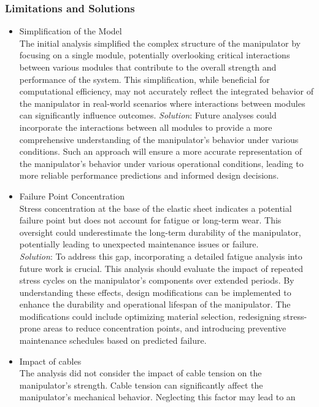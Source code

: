 \subsubsection{Limitations and Solutions}
\begin{itemize}
    \item Simplification of the Model \\
    The initial analysis simplified the complex structure of the manipulator by focusing on a single module, 
    potentially overlooking critical interactions between various modules that contribute to the overall 
    strength and performance of the system. This simplification, while beneficial for computational efficiency, 
    may not accurately reflect the integrated behavior of the manipulator in real-world scenarios where interactions 
    between modules can significantly influence outcomes. 
    \textit{Solution}: Future analyses could incorporate the interactions between all modules to provide a more 
    comprehensive understanding of the manipulator's behavior under various conditions. Such an approach will 
    ensure a more accurate representation of the manipulator's behavior under various operational conditions, 
    leading to more reliable performance predictions and informed design decisions. 
    \item Failure Point Concentration \\
    Stress concentration at the base of the elastic sheet indicates a potential failure point but does not 
    account for fatigue or long-term wear. This oversight could underestimate the long-term durability of 
    the manipulator, potentially leading to unexpected maintenance issues or failure. \\
    \textit{Solution}: To address this gap, incorporating a detailed fatigue analysis into future work is 
    crucial. This analysis should evaluate the impact of repeated stress cycles on the manipulator's components 
    over extended periods. By understanding these effects, design modifications can be implemented to enhance 
    the durability and operational lifespan of the manipulator. The modifications could include optimizing 
    material selection, redesigning stress-prone areas to reduce concentration points, and introducing preventive 
    maintenance schedules based on predicted failure. 
    \item Impact of cables \\
    The analysis did not consider the impact of cable tension on the manipulator's strength. Cable tension 
    can significantly affect the manipulator's mechanical behavior. Neglecting this factor may lead to an 

\end{itemize}
